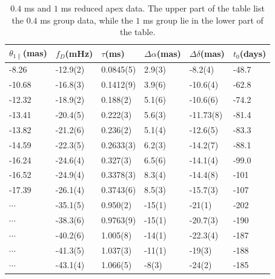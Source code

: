 \documentclass[useAMS,usenatbib]{mn2e}
\begin{document}
\begin{table}
\centering
\begin{tabular}{llllll}
\hline
$\theta_{1\parallel}$(mas) & $f_D$(mHz) & $\tau$(ms)  & $\Delta\alpha$(mas) & $\Delta\delta$(mas) & $t_0$(days)\\
\hline
 -8.26   & -12.9(2)      & 0.0845(5) & 2.9(3)  & -8.2(4)      & -48.7                                \\
-10.68   &-16.8(3)      & 0.1412(9)  & 3.9(6) & -10.6(4)      &-62.8                                \\
-12.32   &-18.9(2)      & 0.188(2)   & 5.1(6) & -10.6(6)      &-74.2                        \\
-13.41 & -20.4(5)      & 0.222(3)     & 5.6(3)  & -11.73(8)    &-81.4                                \\
-13.82 &-21.2(6)        & 0.236(2)    & 5.1(4)  & -12.6(5)      &-83.3                                \\
-14.59   &-22.3(5)      & 0.2633(3)    & 6.2(3)  & -14.2(7)     &-88.1                                \\
-16.24   &-24.6(4)       & 0.327(3)   & 6.5(6)  & -14.1(4)       &-99.0                                \\
-16.52  &-24.9(4)      & 0.3378(3)         & 8.3(4)  & -14.4(8)      &-101                                \\
-17.39   &-26.1(4)    & 0.3743(6)         & 8.5(3)    & -15.7(3)      &-107                               
\\ \hline
$\cdots$&         -35.1(5)  & 0.950(2)   & -15(1)  & -21(1)   &-202                                   \\
$\cdots$ & -38.3(6)  & 0.9763(9)   & -15(1)       & -20.7(3)  &-190                                    \\
$\cdots$ & -40.2(6)  & 1.005(8)    & -14(1)       & -22.3(4)  &-187                                   \\
$\cdots$ & -41.3(5)    & 1.037(3)   & -11(1)     & -19(3)   &-188                                   \\
$ \cdots$ & -43.1(4)      & 1.066(5)    & -8(3)     & -24(2)   &-185   \\
 \hline                                 
\end{tabular}
\caption{ $0.4$ ms and $1$ ms reduced apex data. 
The upper part of the table list the $0.4$ ms group data, while the $1$ ms group lie in the lower part of the table. 
}
\end{table}
\end{document}
